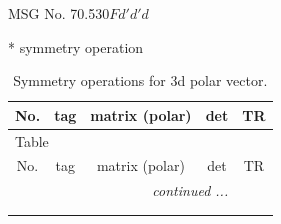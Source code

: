 \documentclass[fleqn,8pt]{jsarticle}
\begin{document}
\setcounter{MaxMatrixCols}{32}

\renewcommand{\tablename}{Table~}
\renewcommand{\figurename}{Figure~}
\begin{center}
\LARGE
MSG No. 70.530\quad$Fd'd'd$
\end{center}
* symmetry operation
\renewcommand{\arraystretch}{1.3}
\begin{longtable}{ccccc}
\caption{Symmetry operations for 3d polar vector.}
 \\
 \hline \hline
No. & tag & matrix (polar) & det & TR \\ \hline \endfirsthead

\multicolumn{4}{l}{\tablename\ \thetable{}} \\
 \hline \hline
No. & tag & matrix (polar) & det & TR \\ \hline \endhead

 \hline \hline
\multicolumn{4}{r}{\footnotesize\it continued ...} \\ \endfoot

 \hline \hline
\multicolumn{4}{r}{} \\ \endlastfoot


\end{longtable}
\end{document}
